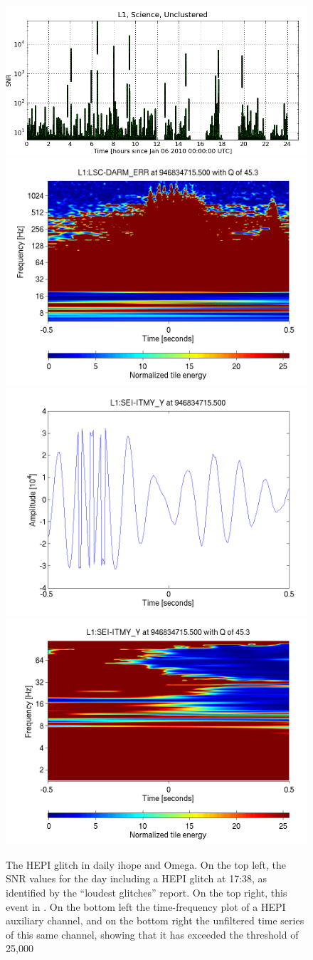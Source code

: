 \begin{figure}
  \includegraphics[width=0.5\linewidth]{figures/detchar/20100106_L1_0_UNCLUSTERED_snr_vs_time}
  \includegraphics[width=0.5\linewidth]{figures/detchar/946834715_499755859_L1_LSC-DARM_ERR_1_00_spectrogram_whitened} \\
  \includegraphics[width=0.5\linewidth]{figures/detchar/946834715_499755859_L1_SEI-ITMY_Y_1_00_timeseries_raw}
  \includegraphics[width=0.5\linewidth]{figures/detchar/946834715_499755859_L1_SEI-ITMY_Y_1_00_spectrogram_whitened}
  \caption[The HEPI glitch in daily ihope and Omega]{
The HEPI glitch in daily ihope and Omega.  On the top left, the SNR
values for the day including a HEPI glitch at 17:38, as identified by
the ``loudest glitches'' report.  On the top right, this event in
\darmerr.  On the bottom left the time-frequency plot of a HEPI
auxiliary channel, and on the bottom right the unfiltered time series
of this same channel, showing that it has exceeded the threshold of
25,000}
\end{figure}%

